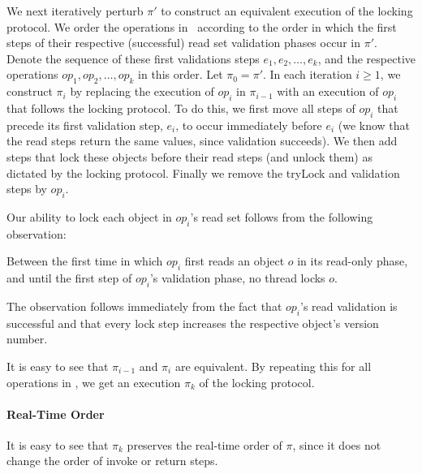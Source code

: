 We next iteratively perturb $\pi'$ to construct an equivalent execution of the locking protocol.
We order the operations in \op\ according to the order in which the first steps of their respective (successful) read set validation phases occur in $\pi'$.
Denote the sequence of these first validations steps $e_1, e_2, \ldots, e_k$, and the respective operations
$op_1, op_2, \ldots, op_k$ in this order. Let $\pi_0 = \pi'$.
In each iteration $i \geq 1$, we construct $\pi_i$ by replacing the execution of $op_i$
in $\pi_{i-1}$ with an execution of $op_i$ that follows the locking protocol. To do this, we first move all steps of $op_i$ that precede 
its first validation step, $e_i$, to occur immediately before $e_i$ (we know that the read steps return the same values, since validation 
succeeds). We then add steps that lock these objects before their read steps (and unlock
them) as dictated by the locking protocol.
Finally we remove the tryLock and validation steps by $op_i$. 

Our ability to lock each object in $op_i$'s read set follows from the following observation:
\begin{observation}
Between the first time in which $op_i$ first reads an object $o$ in its read-only phase, and until the first step of $op_i$'s validation phase, no
 thread locks $o$. 
\end{observation}
The observation follows immediately from the fact that $op_i$'s read validation is successful and that every lock step increases the
respective object's version number. 

It is easy to see that $\pi_{i-1}$ and $\pi_i$ are equivalent. By repeating this for all operations in \op, we get an execution $\pi_k$ of the locking 
protocol.

\paragraph{Real-Time Order}
It is easy to see that $\pi_k$ preserves the real-time order of $\pi$, since it does not change the order of invoke or return steps. 

